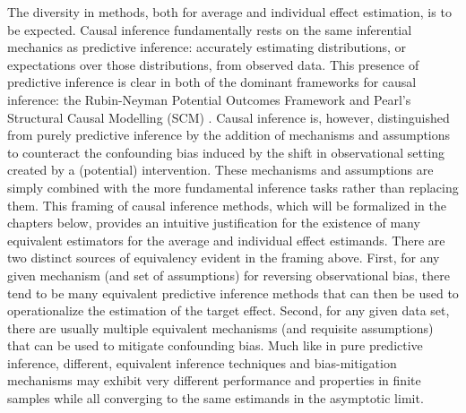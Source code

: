 \documentclass[../main.tex]{subfiles}
\begin{document}
\vspace{\baselineskip}
The diversity in methods, both for average and individual effect estimation, is to be expected. Causal inference fundamentally rests on the same inferential mechanics as predictive inference: accurately estimating distributions, or expectations over those distributions, from observed data. This presence of predictive inference\textit{ }is clear in both of the dominant frameworks for causal inference: the Rubin-Neyman Potential Outcomes Framework \cite{Holland1986StatisticsInference} and Pearl’s Structural Causal Modelling (SCM) \cite{Pearl2009CausalOverview}. Causal inference is, however, distinguished from purely predictive inference by the addition of mechanisms and assumptions to counteract the confounding bias induced by the shift in observational setting created by a (potential) intervention. These mechanisms and assumptions are simply combined with the more fundamental inference tasks rather than replacing them. This framing of causal inference methods, which will be formalized in the chapters below, provides an intuitive justification for the existence of many equivalent estimators for the average and individual effect estimands. There are two distinct sources of equivalency evident in the framing above. First, for any given mechanism (and set of assumptions) for reversing observational bias, there tend to be many equivalent predictive inference methods that can then be used to operationalize the estimation of the target effect. Second, for any given data set, there are usually multiple equivalent mechanisms (and requisite assumptions) that can be used to mitigate confounding bias. Much like in pure predictive inference, different, equivalent inference techniques and bias-mitigation mechanisms may exhibit very different performance and properties in finite samples while all converging to the same estimands in the asymptotic limit.\par
\end{document}
